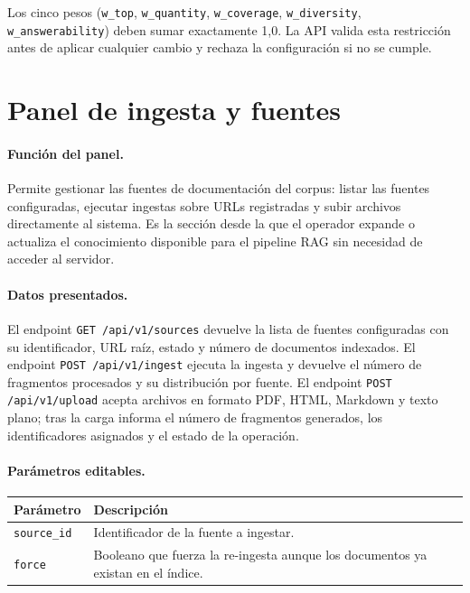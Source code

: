 \documentclass[11pt]{article}
\begin{document}
Los cinco pesos (\texttt{w\_top}, \texttt{w\_quantity}, \texttt{w\_coverage},
\texttt{w\_diversity}, \texttt{w\_answerability}) deben sumar exactamente 1{,}0. La API
valida esta restricción antes de aplicar cualquier cambio y rechaza la configuración si no
se cumple.

\section{Panel de ingesta y fuentes}

\paragraph{Función del panel.}
Permite gestionar las fuentes de documentación del corpus: listar las fuentes configuradas,
ejecutar ingestas sobre URLs registradas y subir archivos directamente al sistema. Es la
sección desde la que el operador expande o actualiza el conocimiento disponible para el pipeline
RAG sin necesidad de acceder al servidor.

\paragraph{Datos presentados.}
El endpoint \texttt{GET /api/v1/sources} devuelve la lista de fuentes configuradas con su
identificador, URL raíz, estado y número de documentos indexados. El endpoint
\texttt{POST /api/v1/ingest} ejecuta la ingesta y devuelve el número de fragmentos procesados
y su distribución por fuente. El endpoint \texttt{POST /api/v1/upload} acepta archivos en
formato PDF, HTML, Markdown y texto plano; tras la carga informa el número de fragmentos
generados, los identificadores asignados y el estado de la operación.

\paragraph{Parámetros editables.}

\begin{center}
\begin{tabular}{lp{9cm}}
\toprule
\textbf{Parámetro} & \textbf{Descripción} \\
\midrule
\texttt{source\_id} & Identificador de la fuente a ingestar. \\
\texttt{force}      & Booleano que fuerza la re-ingesta aunque los documentos ya existan
                      en el índice. \\
\bottomrule
\end{tabular}
\end{center}
\end{document}
